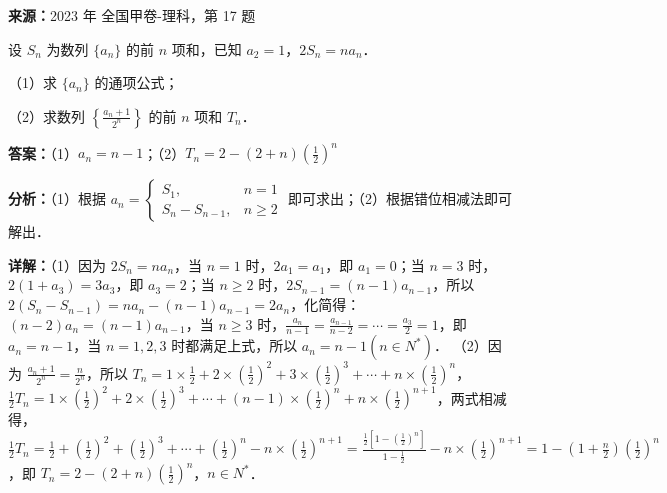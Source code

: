 \begin{question}[points=12]
\textbf{来源：}2023 年 全国甲卷-理科，第 17 题\par
设 $S_n$ 为数列 $\{a_n\}$ 的前 $n$ 项和，已知 $a_2 = 1$，$2S_n = n a_n$．

（1）求 $\{a_n\}$ 的通项公式；

（2）求数列 $\left\{ \frac{a_n+1}{2^n} \right\}$ 的前 $n$ 项和 $T_n$．
\begin{solution}
\textbf{答案：}（1）$a_n = n-1$；（2）$T_n = 2 - (2+n)\left(\frac{1}{2}\right)^n$

\textbf{分析：}（1）根据 $a_n = \begin{cases} S_1, & n=1 \\ S_n-S_{n-1}, & n\ge 2 \end{cases}$ 即可求出；（2）根据错位相减法即可解出．

\textbf{详解：}（1）因为 $2S_n = n a_n$，当 $n=1$ 时，$2a_1 = a_1$，即 $a_1=0$；当 $n=3$ 时，$2(1+a_3)=3a_3$，即 $a_3=2$；当 $n\ge2$ 时，$2S_{n-1} = (n-1)a_{n-1}$，所以 $2(S_n-S_{n-1}) = n a_n - (n-1)a_{n-1} = 2a_n$，化简得：$(n-2)a_n = (n-1)a_{n-1}$，当 $n\ge3$ 时，$\frac{a_n}{n-1} = \frac{a_{n-1}}{n-2} = \cdots = \frac{a_3}{2} = 1$，即 $a_n = n-1$，当 $n=1,2,3$ 时都满足上式，所以 $a_n = n-1 (n\in N^*)$．
（2）因为 $\frac{a_n+1}{2^n} = \frac{n}{2^n}$，所以 $T_n = 1\times\frac{1}{2} + 2\times\left(\frac{1}{2}\right)^2 + 3\times\left(\frac{1}{2}\right)^3 + \cdots + n\times\left(\frac{1}{2}\right)^n$，$\frac{1}{2}T_n = 1\times\left(\frac{1}{2}\right)^2 + 2\times\left(\frac{1}{2}\right)^3 + \cdots + (n-1)\times\left(\frac{1}{2}\right)^n + n\times\left(\frac{1}{2}\right)^{n+1}$，两式相减得，$\frac{1}{2}T_n = \frac{1}{2} + \left(\frac{1}{2}\right)^2 + \left(\frac{1}{2}\right)^3 + \cdots + \left(\frac{1}{2}\right)^n - n\times\left(\frac{1}{2}\right)^{n+1} = \frac{\frac{1}{2}\left[1-\left(\frac{1}{2}\right)^n\right]}{1-\frac{1}{2}} - n\times\left(\frac{1}{2}\right)^{n+1} = 1 - \left(1+\frac{n}{2}\right)\left(\frac{1}{2}\right)^n$，即 $T_n = 2 - (2+n)\left(\frac{1}{2}\right)^n$，$n\in N^*$．
\end{solution}
\end{question}

